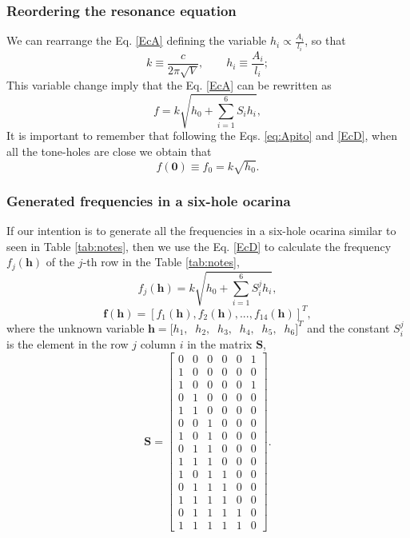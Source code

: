 \documentclass[11pt,twocolumn]{article}
\begin{document}
\subsubsection{Reordering the resonance equation}
We can rearrange the Eq. \ref{EcA} defining the variable $h_{i}\propto \frac{A_{i}}{l_{i}}$, so that
\begin{equation} \label{EcC}
k \equiv \frac{c}{2 {\pi}\sqrt{V}},\qquad  h_{i} \equiv  \frac{A_{i}}{l_{i}} ;
\end{equation}
This variable change imply that the Eq. \ref{EcA} can be rewritten as
\begin{equation} \label{EcD}
f = k \sqrt{h_0 +\sum_{i=1}^{6}{S_i h_i}},
\end{equation}
It is important to remember that following the Eqs. \ref{eq:Apito} and \ref{EcD},
when all the tone-holes are close we obtain that 
\begin{equation} \label{EcDa}
f(\mathbf{0}) \equiv f_0 = k \sqrt{h_0}.
\end{equation}

\subsubsection{Generated frequencies in a six-hole ocarina}

If our intention is to generate all the frequencies in a six-hole ocarina
similar to seen in Table \ref{tab:notes}, then we 
use the Eq. \ref{EcD} to calculate the frequency $f_j(\mathbf{h})$ of the $j$-th row in the Table \ref{tab:notes},
\begin{equation} \label{EcDbh}
f_j(\mathbf{h}) = k \sqrt{h_0 +\sum_{i=1}^{6}{S^{j}_{i} h_i}},
\end{equation}
\begin{equation} \label{EcDbvech}
\mathbf{f}(\mathbf{h})=\left[f_1(\mathbf{h}), f_2(\mathbf{h}), ..., f_{14}(\mathbf{h})\right]^{T},
\end{equation}
where the unknown variable $\mathbf{h}=[h_{1},$ $~h_{2},$ $~h_{3},$ $~h_{4},$ $~h_{5},$ $~h_{6}]^T$
and 
the constant $S_{i}^{j}$ is the element in the row $j$ column $i$ in the matrix $\mathbf{S}$,
\begin{equation}
 \mathbf{S}=
\begin{bmatrix}
0 & 0 & 0 & 0 & 0 & 1 \\
1 & 0 & 0 & 0 & 0 & 0 \\
1 & 0 & 0 & 0 & 0 & 1 \\
0 & 1 & 0 & 0 & 0 & 0 \\ 
1 & 1 & 0 & 0 & 0 & 0 \\ 
0 & 0 & 1 & 0 & 0 & 0 \\
1 & 0 & 1 & 0 & 0 & 0 \\ 
0 & 1 & 1 & 0 & 0 & 0 \\ 
1 & 1 & 1 & 0 & 0 & 0 \\ 
1 & 0 & 1 & 1 & 0 & 0 \\ 
0 & 1 & 1 & 1 & 0 & 0 \\ 
1 & 1 & 1 & 1 & 0 & 0 \\
0 & 1 & 1 & 1 & 1 & 0 \\
1 & 1 & 1 & 1 & 1 & 0 
\end{bmatrix}.
\end{equation}
\end{document}
